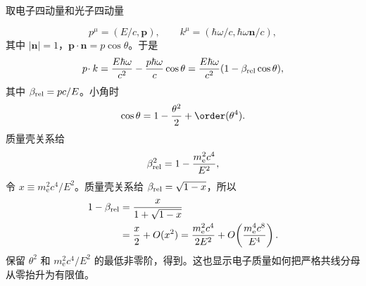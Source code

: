 
\begin{derivation}[软共线分母中的质量与角度尺度]
取电子四动量和光子四动量

\begin{equation*}
 p^\mu=(E/c,\mathbf p),
 \qquad
 k^\mu=(\hbar\omega/c,\hbar\omega\mathbf n/c),
\end{equation*}
其中 $|\mathbf n|=1$，$\mathbf p\cdot\mathbf n=p\cos\theta$。于是
\begin{equation*}
 p\!\cdot k
 =\frac{E\hbar\omega}{c^2}
 -\frac{p\hbar\omega}{c}\cos\theta
 =\frac{E\hbar\omega}{c^2}(1-\beta_{\rm rel}\cos\theta),
\end{equation*}
其中 $\beta_{\rm rel}=pc/E$。小角时
\begin{equation*}
 \cos\theta=1-\frac{\theta^2}{2}+\order(\theta^4).
\end{equation*}
质量壳关系给
\begin{equation*}
 \beta_{\rm rel}^2=1-\frac{m_{\mathrm e}^2c^4}{E^2},
\end{equation*}
令 $x\equiv m_{\mathrm e}^2c^4/E^2$。质量壳关系给 $\beta_{\rm rel}=\sqrt{1-x}$，所以
\begin{align*}
1-\beta_{\rm rel}
&=\frac{x}{1+\sqrt{1-x}}\\
&=\frac{x}{2}+O(x^2)
=\frac{m_{\mathrm e}^2c^4}{2E^2}
+O\!\left(\frac{m_{\mathrm e}^4c^8}{E^4}\right).
\end{align*}
保留 $\theta^2$ 和 $m_{\mathrm e}^2c^4/E^2$ 的最低非零阶，得到。这也显示电子质量如何把严格共线分母从零抬升为有限值。
\end{derivation}

